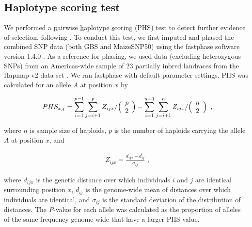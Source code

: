 \subsection*{Haplotype scoring test}
We performed a \underline{p}airwise \underline{h}aplotype \underline{s}coring (PHS) test to detect further evidence of selection, following \cite{Toomajian_2006_16623598}.  
To conduct this test, we first imputed and phased the combined SNP data (both GBS and MaizeSNP50) using the {\sf fastphase} software version 1.4.0 \cite[]{Scheet_2006_16532393}.  
As a reference for phasing, we used data (excluding heterozygous SNPs) from an Americas-wide sample of 23 partially inbred landraces from the Hapmap v2 data set  \cite[]{Chia_2012_22660545}.  
We ran {\sf fastphase}  with default parameter settings.  
PHS was calculated for an allele \emph{A} at position $x$ by

\begin{equation}
  \label{phs-1}
  \begin{array}{l}
  \displaystyle{
PHS_{x_A} = \sum^{p-1}_{i=1}\sum^{p}_{j=i+1}Z_{ijx}  / \Bigl( \begin{array}{c} p \\ 2 \\ \end{array} \Bigr) 
- \sum^{n-1}_{i=1}\sum^{n}_{j=i+1}Z_{ijx}  / \Bigl( \begin{array}{c} n \\ 2 \\ \end{array} \Bigr) 
  }
  \end {array} 
  \textrm{,}
\end{equation}

\noindent where $n$ is sample size of haploids, $p$  is the number of haploids carrying the allele $A$ at position $x$, and

\begin{equation}
  \label{phs-2}
  \begin{array}{l}
  \displaystyle{
Z_{ijx} = \frac{ d_{ijx} - \bar{d_{ij}} }{ \sigma_{ij} }
  }
  \end {array} 
  \textrm{,}
\end{equation}

\noindent where $d_{ijx}$ is the genetic distance over which individuals $i$ and $j$ are identical surrounding position $x$, $\bar{d_{ij}}$ is the genome-wide mean of distances over which individuals are identical, and $\sigma_{ij}$ is the standard deviation of the distribution of distances.  
The \emph{P}-value for each allele was calculated as the proportion of alleles of the same frequency genome-wide that have a larger PHS value. 

